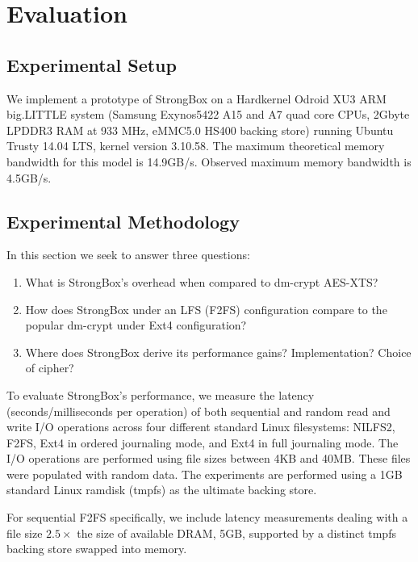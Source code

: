 \section{Evaluation}\label{sec:evaluation}

\subsection{Experimental Setup}

We implement a prototype of StrongBox on a Hardkernel Odroid XU3 ARM big.LITTLE
system (Samsung Exynos5422 A15 and A7 quad core CPUs, 2Gbyte LPDDR3 RAM at 933
MHz, eMMC5.0 HS400 backing store) running Ubuntu Trusty 14.04 LTS, kernel
version 3.10.58. The maximum theoretical memory bandwidth for this model is
14.9GB/s\@. Observed maximum memory bandwidth is 4.5GB/s.

\subsection{Experimental Methodology}

In this section we seek to answer three questions:
\begin{enumerate}
\item What is StrongBox's overhead when compared to dm-crypt AES-XTS?
\item How does StrongBox under an LFS (\ie F2FS) configuration compare to
the popular dm-crypt under Ext4 configuration?
\item Where does StrongBox derive its performance gains? Implementation? Choice
of cipher?
\end{enumerate}

To evaluate StrongBox's performance, we measure the latency
(seconds/milliseconds per operation) of both sequential and random
read and write I/O operations across four different standard Linux
filesystems: NILFS2, F2FS, Ext4 in ordered journaling mode, and Ext4
in full journaling mode. The I/O operations are performed using file
sizes between 4KB and 40MB. These files were populated with random
data. The experiments are performed using a 1GB standard Linux ramdisk
(tmpfs) as the ultimate backing store.

For sequential F2FS specifically, we include latency measurements dealing
with a file size $2.5\times$ the size of available DRAM, \ie
5GB, supported by a distinct tmpfs backing store swapped into memory.

